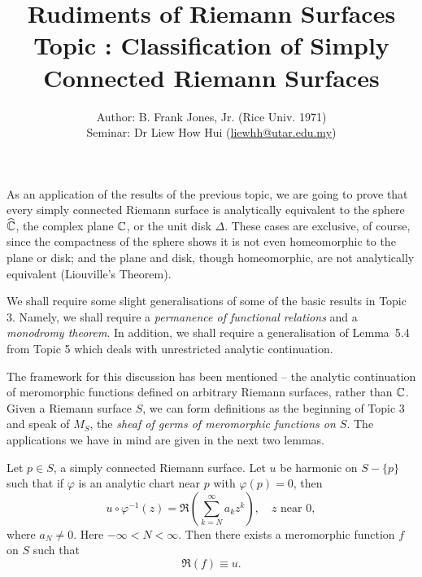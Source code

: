 \documentclass[a4paper,11pt]{article}
\newcounter{topic}
\begin{document}
\title{{\sc Rudiments of Riemann Surfaces\\
    Topic \thetopic{}: Classification of Simply Connected Riemann Surfaces}}
\author{Author: B. Frank Jones, Jr. (Rice Univ. 1971)\\
Seminar: Dr Liew How Hui (\url{liewhh@utar.edu.my})}
\date{}

\maketitle

As an application of the results of the previous topic, we are going
to prove that every simply connected Riemann surface is analytically
equivalent to the sphere $\widehat{{\mathbb C}}$, the complex plane ${\mathbb C}$,
or the unit disk $\Delta$.  These cases are exclusive, of course,
since the compactness of the sphere shows it is not even homeomorphic
to the plane or disk; and the plane and disk, though homeomorphic, are
not analytically equivalent (Liouville's Theorem).

We shall require some slight generalisations of some of the basic
results in Topic 3.  Namely, we shall require a \emph{permanence of
  functional relations} and a \emph{monodromy theorem}.  In addition,
we shall require a generalisation of Lemma~5.4 from Topic 5 which
deals with unrestricted analytic continuation.

The framework for this discussion has been mentioned -- the analytic
continuation of meromorphic functions defined on arbitrary Riemann
surfaces, rather than ${\mathbb C}$.  Given a Riemann surface $S$, we can
form definitions as the beginning of Topic 3 and speak of $M_S$, the
\emph{sheaf of germs of meromorphic functions on $S$}.  The
applications we have in mind are given in the next two lemmas.

\begin{lem}
  \label{lem:1}
  Let $p \in S$, a simply connected Riemann surface.  Let $u$ be
  harmonic on $S - \{p\}$ such that if $\varphi$ is an analytic chart
  near $p$ with $\varphi(p) = 0$, then
  $$
  u \circ \varphi^{-1}(z) = \Re(\sum_{k=N}^{\infty} a_k z^k),\quad
  z\text{ near }0,
  $$
  where $a_N \ne 0$.  Here $-\infty < N < \infty$.  Then there
  exists a meromorphic function $f$ on $S$ such that
  \begin{equation}
    \label{e:1}
    \Re(f) \equiv u.
  \end{equation}
\end{lem}
\end{document}
